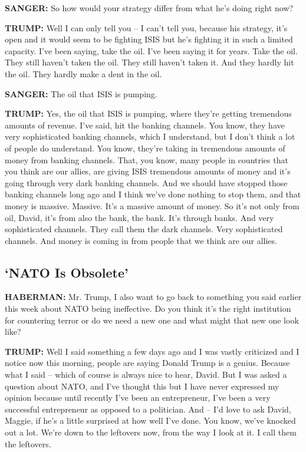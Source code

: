 \textbf{SANGER:} So how would your strategy differ from what he's doing
right now?

\textbf{TRUMP:} Well I can only tell you -- I can't tell you, because
his strategy, it's open and it would seem to be fighting ISIS but he's
fighting it in such a limited capacity. I've been saying, take the oil.
I've been saying it for years. Take the oil. They still haven't taken
the oil. They still haven't taken it. And they hardly hit the oil. They
hardly make a dent in the oil.

\textbf{SANGER:} The oil that ISIS is pumping.

\textbf{TRUMP:} Yes, the oil that ISIS is pumping, where they're getting
tremendous amounts of revenue. I've said, hit the banking channels. You
know, they have very sophisticated banking channels, which I understand,
but I don't think a lot of people do understand. You know, they're
taking in tremendous amounts of money from banking channels. That, you
know, many people in countries that you think are our allies, are giving
ISIS tremendous amounts of money and it's going through very dark
banking channels. And we should have stopped those banking channels long
ago and I think we've done nothing to stop them, and that money is
massive. Massive. It's a massive amount of money. So it's not only from
oil, David, it's from also the bank, the bank. It's through banks. And
very sophisticated channels. They call them the dark channels. Very
sophisticated channels. And money is coming in from people that we think
are our allies.

\hypertarget{nato-is-obsolete}{%
\subsection{`NATO Is Obsolete'}\label{nato-is-obsolete}}

\textbf{HABERMAN:} Mr. Trump, I also want to go back to something you
said earlier this week about NATO being ineffective. Do you think it's
the right institution for countering terror or do we need a new one and
what might that new one look like?

\textbf{TRUMP:} Well I said something a few days ago and I was vastly
criticized and I notice now this morning, people are saying Donald Trump
is a genius. Because what I said -- which of course is always nice to
hear, David. But I was asked a question about NATO, and I've thought
this but I have never expressed my opinion because until recently I've
been an entrepreneur, I've been a very successful entrepreneur as
opposed to a politician. And -- I'd love to ask David, Maggie, if he's a
little surprised at how well I've done. You know, we've knocked out a
lot. We're down to the leftovers now, from the way I look at it. I call
them the leftovers.

